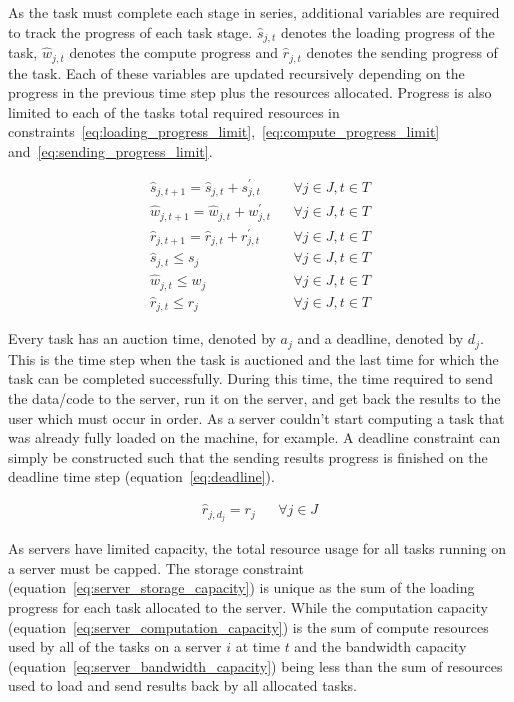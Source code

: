 As the task must complete each stage in series, additional variables are required to track the progress of
each task stage. $\hat{s}_{j,t}$ denotes the loading progress of the task, $\hat{w}_{j,t}$ denotes the compute progress
and $\hat{r}_{j,t}$ denotes the sending progress of the task. Each of these variables are updated recursively depending
on the progress in the previous time step plus the resources allocated. Progress is also limited to each of the tasks
total required resources in constraints~\eqref{eq:loading_progress_limit},~\eqref{eq:compute_progress_limit}
and~\eqref{eq:sending_progress_limit}.

\begin{align}
    \hat{s}_{j,t+1} = \hat{s}_{j,t} + s^{'}_{j,t} && \forall{j \in J, t \in T } \label{eq:loading_progress} \\
    \hat{w}_{j,t+1} = \hat{w}_{j,t} + w^{'}_{j,t} && \forall{j \in J, t \in T } \label{eq:compute_progress} \\
    \hat{r}_{j,t+1} = \hat{r}_{j,t} + r^{'}_{j,t} && \forall{j \in J, t \in T } \label{eq:sending_progress} \\
    \hat{s}_{j,t} \leq s_j && \forall{j \in J, t \in T} \label{eq:loading_progress_limit} \\
    \hat{w}_{j,t} \leq w_j && \forall{j \in J, t \in T} \label{eq:compute_progress_limit} \\
    \hat{r}_{j,t} \leq r_j && \forall{j \in J, t \in T} \label{eq:sending_progress_limit}
\end{align}

Every task has an auction time, denoted by $a_j$ and a deadline, denoted by $d_j$. This is the time step when the task
is auctioned and the last time for which the task can be completed successfully. During this time, the time required
to send the data/code to the server, run it on the server, and get back the results to the user which must occur in
order. As a server couldn't start computing a task that was already fully loaded on the machine, for example. A
deadline constraint can simply be constructed such that the sending results progress is finished on the deadline
time step (equation~\eqref{eq:deadline}).

\begin{align}
    \hat{r}_{j, d_j} = r_j && \forall{j \in J} \label{eq:deadline}
\end{align}

As servers have limited capacity, the total resource usage for all tasks running on a server must be capped.
The storage constraint (equation~\eqref{eq:server_storage_capacity}) is unique as the sum of the loading progress for
each task allocated to the server. While the computation capacity (equation~\eqref{eq:server_computation_capacity}) is
the sum of compute resources used by all of the tasks on a server $i$ at time $t$ and the bandwidth capacity
(equation~\eqref{eq:server_bandwidth_capacity}) being less than the sum of resources used to load and send results back
by all allocated tasks.

